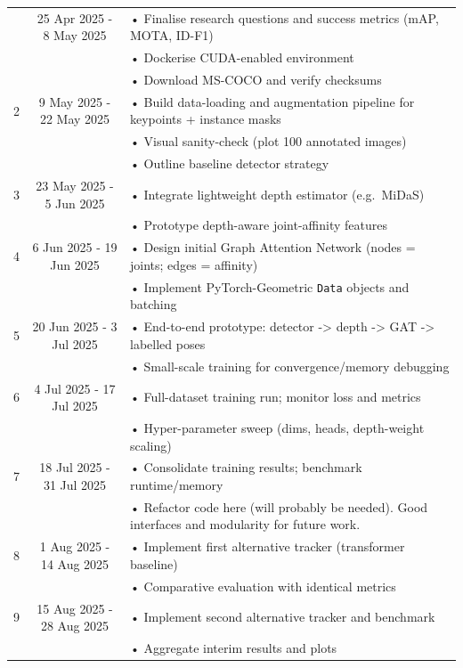 \begin{longtable}{@{} c c p{10.5cm} @{}}
\bottomrule
\endlastfoot
1  & 25 Apr 2025 - 8 May 2025 & • Finalise research questions and success metrics (mAP, MOTA, ID-F1)\\
   &                & • Dockerise CUDA-enabled environment \\
   &                & • Download MS-COCO and verify checksums\\
\midrule
2  & 9 May 2025 - 22 May 2025 & • Build data-loading and augmentation pipeline for keypoints + instance masks\\
   &                & • Visual sanity-check (plot 100 annotated images)\\
   &                & • Outline baseline detector strategy\\
\midrule
3  & 23 May 2025 - 5 Jun 2025 & • Integrate lightweight depth estimator (e.g.\ MiDaS)\\
   &                & • Prototype depth-aware joint-affinity features\\
\midrule
4  & 6 Jun 2025 - 19 Jun 2025 & • Design initial Graph Attention Network (nodes = joints; edges = affinity)\\
   &                & • Implement PyTorch-Geometric \texttt{Data} objects and batching\\
\midrule
5  & 20 Jun 2025 - 3 Jul 2025 & • End-to-end prototype: detector -> depth -> GAT -> labelled poses\\
   &                & • Small-scale training for convergence/memory debugging\\
\midrule
6  & 4 Jul 2025 - 17 Jul 2025 & • Full-dataset training run; monitor loss and metrics\\
   &                & • Hyper-parameter sweep (dims, heads, depth-weight scaling)\\
\midrule
7  & 18 Jul 2025 - 31 Jul 2025 & • Consolidate training results; benchmark runtime/memory\\
   &                & • Refactor code here (will probably be needed). Good interfaces and modularity for future work.\\
\midrule
8  & 1 Aug 2025 - 14 Aug 2025 & • Implement first alternative tracker (transformer baseline)\\
   &                & • Comparative evaluation with identical metrics\\
\midrule
9  & 15 Aug 2025 - 28 Aug 2025 & • Implement second alternative tracker and benchmark\\
   &                & • Aggregate interim results and plots\\

\end{longtable}
